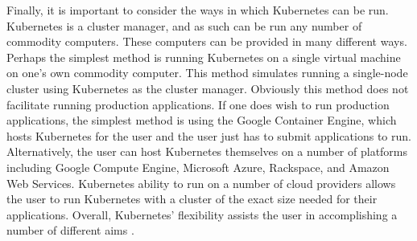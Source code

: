 Finally, it is important to consider the ways in which Kubernetes can be run.
Kubernetes is a cluster manager, and as such can be run any number of commodity
computers. These computers can be provided in many different ways. Perhaps the
simplest method is running Kubernetes on a single virtual machine on one's own
commodity computer. This method simulates running a single-node cluster using
Kubernetes as the cluster manager. Obviously this method does not facilitate
running production applications. If one does wish to run production
applications, the simplest method is using the Google Container Engine, which
hosts Kubernetes for the user and the user just has to submit applications to
run. Alternatively, the user can host Kubernetes themselves on a number of
platforms including Google Compute Engine, Microsoft Azure, Rackspace, and
Amazon Web Services. Kubernetes ability to run on a number of cloud providers
allows the user to run Kubernetes with a cluster of the exact size needed for
their applications. Overall, Kubernetes' flexibility assists the user in
accomplishing a number of different aims \cite{getting-started-k8s}.
